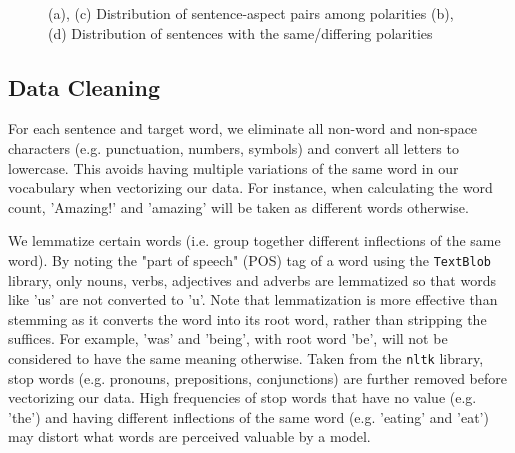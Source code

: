 \documentclass[comsoc,conference]{IEEEtran}
\begin{document}
\begin{figure}[!htbp]
    \hfill
  \caption{(a), (c) Distribution of sentence-aspect pairs among polarities (b), (d) Distribution of sentences with the same/differing polarities}
  \label{fig:1} 
\end{figure}

\subsection{Data Cleaning}

For each sentence and target word, we eliminate all non-word and non-space characters (e.g. punctuation, numbers, symbols) and convert all letters to lowercase. This avoids having multiple variations of the same word in our vocabulary when vectorizing our data. For instance, when calculating the word count, 'Amazing!' and 'amazing' will be taken as different words otherwise.

We lemmatize certain words (i.e. group together different inflections of the same word). By noting the "part of speech"  (POS) tag of a word using the \texttt{TextBlob} library, only nouns, verbs, adjectives and adverbs are lemmatized so that words like 'us' are not converted to 'u'. Note that lemmatization is more effective than stemming as it converts the word into its root word, rather than stripping the suffices. For example, 'was' and 'being', with root word 'be', will not be considered to have the same meaning otherwise. Taken from the \texttt{nltk} library, stop words (e.g. pronouns, prepositions, conjunctions) are further removed before vectorizing our data. High frequencies of stop words that have no value (e.g. 'the') and having different inflections of the same word (e.g. 'eating' and 'eat') may distort what words are perceived valuable by a model.
\end{document}
